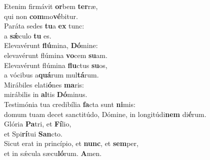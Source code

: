 \evenverse Etenim firmávit \textbf{or}bem \textbf{ter}ræ,~\*\\
\evenverse qui non \textbf{com}mo\textbf{vé}bitur.\\
\oddverse Paráta sedes \textbf{tu}a \textbf{ex} tunc:~\*\\
\oddverse a \textbf{sǽ}culo \textbf{tu} es.\\
\evenverse Elevavérunt \textbf{flú}mina, \textbf{Dó}mine:~\*\\
\evenverse elevavérunt flúmina \textbf{vo}cem \textbf{su}am.\\
\oddverse Elevavérunt flúmina \textbf{flu}ctus \textbf{su}os,~\*\\
\oddverse a vócibus a\textbf{quá}rum mul\textbf{tá}rum.\\
\evenverse Mirábiles elati\textbf{ó}nes \textbf{ma}ris:~\*\\
\evenverse mirábilis in \textbf{al}tis \textbf{Dó}minus.\\
\oddverse Testimónia tua credibília \textbf{fa}cta sunt \textbf{ni}mis:~\*\\
\oddverse domum tuam decet sanctitúdo, Dómine, in longitúdi\textbf{nem} di\textbf{é}rum.\\
\evenverse Glória \textbf{Pa}tri, et \textbf{Fí}lio,~\*\\
\evenverse et Spi\textbf{rí}tui \textbf{San}cto.\\
\oddverse Sicut erat in princípio, et \textbf{nunc}, et \textbf{sem}per,~\*\\
\oddverse et in sǽcula sæcu\textbf{ló}rum. \textbf{A}men.\\
